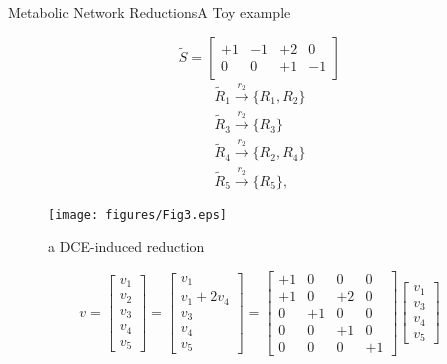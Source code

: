 \documentclass[10pt]{beamer}
\theoremstyle{remark}
\theoremstyle{definition}
\begin{document}
\begin{frame}{Metabolic Network Reductions}{A Toy example}
\noindent
\begin{minipage}[t]{.49\textwidth}
\raggedright
\[
\tilde{S} = \left[
\begin{array}{cccc}
+1 & -1 & +2 & 0\\
0 & 0 & +1 & -1
\end{array}
\right]
\]
\[
\begin{array}{l}
\tilde{R}_1 \xrightarrow{r_2} \{R_1, R_2\} \\
\tilde{R}_3 \xrightarrow{r_2} \{R_3\} \\
\tilde{R}_4 \xrightarrow{r_2} \{R_2, R_4\} \\
\tilde{R}_5 \xrightarrow{r_2} \{R_5\},
\end{array}
\]
\end{minipage}
\hfill
\begin{minipage}[t]{.49\textwidth}
\raggedleft
\begin{figure}[ht]%
    \centering
    \texttt{[image: figures/Fig3.eps]}
    \caption{a DCE-induced reduction}
\end{figure}
\end{minipage}\pause
\[
v = \left[
\begin{array}{c}
v_1\\
v_2\\
v_3\\
v_4\\
v_5
\end{array}
\right] = \left[
\begin{array}{c}
v_1\\
v_1 + 2v_4\\
v_3\\
v_4\\
v_5
\end{array}
\right] =
\left[
\begin{array}{cccc}
+1 & 0 & 0 & 0\\
+1 & 0 & +2 & 0\\
0 & +1 & 0 & 0\\
0 & 0 & +1 & 0\\
0 & 0 & 0 & +1
\end{array}
\right]\left[
\begin{array}{c}
v_1\\
v_3\\
v_4\\
v_5
\end{array}
\right] 
\]
\end{frame}
\end{document}
